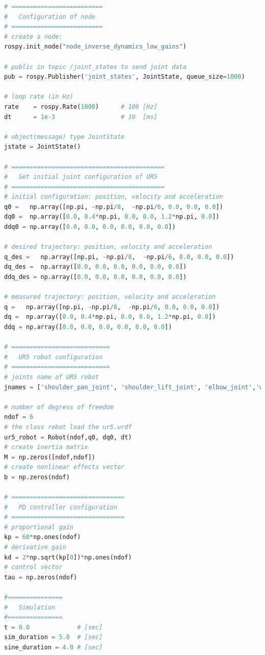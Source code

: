 \begin{lstlisting}[language=Python,caption={Move the second and fifth joint of UR5 robot with the required movement of activity 2.3.}, label={lst:inverse_dynamics_control_low_gains}]
# =========================
#   Configuration of node
# =========================
# create a node: 
rospy.init_node("node_inverse_dynamics_low_gains")

# public in topic /joint_states	to send joint data	
pub = rospy.Publisher('joint_states', JointState, queue_size=1000)

# loop rate (in Hz)
rate 	= rospy.Rate(1000)		# 100 [Hz]
dt 		= 1e-3					# 10  [ms]

# object(message) type JointState
jstate = JointState()

# ==========================================
#   Set initial joint configuration of UR5
# ==========================================
# initial configuration: position, velocity and acceleration 
q0 =   np.array([np.pi, -np.pi/8,  -np.pi/6, 0.0, 0.0, 0.0])
dq0 =  np.array([0.0, 0.4*np.pi, 0.0, 0.0, 1.2*np.pi, 0.0]) 
ddq0 = np.array([0.0, 0.0, 0.0, 0.0, 0.0, 0.0]) 

# desired trajectory: position, velocity and acceleration
q_des =   np.array([np.pi, -np.pi/8,  -np.pi/6, 0.0, 0.0, 0.0]) 
dq_des =  np.array([0.0, 0.0, 0.0, 0.0, 0.0, 0.0]) 
ddq_des = np.array([0.0, 0.0, 0.0, 0.0, 0.0, 0.0]) 

# measured trajectory: position, velocity and acceleration
q =   np.array([np.pi, -np.pi/8,  -np.pi/6, 0.0, 0.0, 0.0])
dq =  np.array([0.0, 0.4*np.pi, 0.0, 0.0, 1.2*np.pi, 0.0])
ddq = np.array([0.0, 0.0, 0.0, 0.0, 0.0, 0.0]) 

# ===========================
#   UR5 robot configuration
# ===========================
# joints name of UR5 robot
jnames = ['shoulder_pan_joint', 'shoulder_lift_joint', 'elbow_joint','wrist_1_joint', 'wrist_2_joint', 'wrist_3_joint']

# number of degress of freedom
ndof = 6
# the class robot load the ur5.urdf
ur5_robot = Robot(ndof,q0, dq0, dt)
# create inertia matrix 
M = np.zeros([ndof,ndof])
# create nonlinear effects vector
b = np.zeros(ndof)

# ===============================
#   PD controller configuration
# ===============================
# proportional gain
kp = 60*np.ones(ndof)
# derivative gain
kd = 2*np.sqrt(kp[0])*np.ones(ndof)
# control vector
tau = np.zeros(ndof)    

#===============
#   Simulation
#===============
t = 0.0             # [sec] 
sim_duration = 5.0  # [sec]
sine_duration = 4.0 # [sec]


\end{lstlisting}
